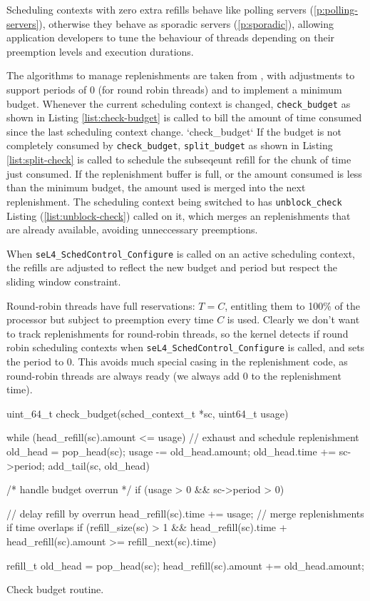 Scheduling contexts with zero extra refills behave like polling servers (\cref{p:polling-servers}), otherwise they behave as sporadic servers (\cref{p:sporadic}), allowing application developers to tune the behaviour of threads depending on their preemption levels and execution durations.

The algorithms to manage replenishments are taken from \citet{Danish_LW_11}, with adjustments to support periods of 0 (for round robin threads) and to implement a minimum budget.
Whenever the current scheduling context is changed, \texttt{check\_budget} as shown in Listing \ref{list:check-budget} is called to bill the amount of time consumed since the last scheduling context change.
`check\_budget`
If the budget is not completely consumed by \texttt{check\_budget}, \texttt{split\_budget} as shown in Listing \ref{list:split-check} is called to schedule the subseqeunt refill for the chunk of time just consumed.
If the replenishment buffer is full, or the amount consumed is less than the minimum budget, the amount used is merged into the next replenishment.
The scheduling context being switched to has \texttt{unblock\_check} Listing (\ref{list:unblock-check}) called on it, which merges an replenishments that are already available, avoiding unneccessary preemptions.

When \texttt{seL4\_SchedControl\_Configure} is called on an active scheduling context, the refills are adjusted to reflect the new budget and period but respect the sliding window constraint.

Round-robin threads have full reservations: $T = C$, entitling them to 100\% of the processor but subject to preemption every time $C$ is used.
Clearly we don't want to track replenishments for round-robin threads, so the kernel detects if round robin scheduling contexts when \texttt{seL4\_SchedControl\_Configure} is called, and sets the period to 0.
This avoids much special casing in the replenishment code, as round-robin threads are always ready (we always add 0 to the replenishment time).

\begin{listing}[b]
\begin{ccode}

uint_64_t check_budget(sched_context_t *sc, uint64_t usage) {
  while (head_refill(sc).amount <= usage) {
    // exhaust and schedule replenishment
    old_head = pop_head(sc);
    usage -= old_head.amount;
    old_head.time += sc->period;
    add_tail(sc, old_head)
  }

  /* handle budget overrun */
  if (usage > 0 && sc->period > 0) {
    // delay refill by overrun
    head_refill(sc).time += usage;
    // merge replenishments if time overlaps
    if (refill_size(sc) > 1 &&
        head_refill(sc).time + head_refill(sc).amount
        >= refill_next(sc).time) {

      refill_t old_head = pop_head(sc);
      head_refill(sc).amount += old_head.amount;
    }
  }
}
\end{ccode}
\caption{Check budget routine.}
\label{list:check-budget}
\end{listing}


